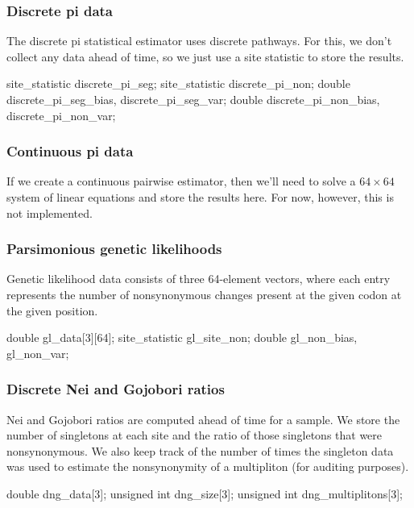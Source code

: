 \documentclass{article}
\begin{document}
      \subsubsection{Discrete pi data}

	The discrete pi statistical estimator uses discrete pathways. For this,
        we don't collect any data ahead of time, so we just use a site statistic
	to store the results.

\begin{ccode}
  site_statistic	discrete_pi_seg;
  site_statistic	discrete_pi_non;
  double		discrete_pi_seg_bias, discrete_pi_seg_var;
  double		discrete_pi_non_bias, discrete_pi_non_var;
\end{ccode}

      \subsubsection{Continuous pi data}

	If we create a continuous pairwise estimator, then we'll need to solve a
	$64 \times 64$ system of linear equations and store the results here.
	For now, however, this is not implemented.

      \subsubsection{Parsimonious genetic likelihoods}

	Genetic likelihood data consists of three 64-element vectors, where each
	entry represents the number of nonsynonymous changes present at the
	given codon at the given position.

\begin{ccode}
  double		gl_data[3][64];
  site_statistic	gl_site_non;
  double		gl_non_bias, gl_non_var;
\end{ccode}

      \subsubsection{Discrete Nei and Gojobori ratios}

	Nei and Gojobori ratios are computed ahead of time for a sample. We
	store the number of singletons at each site and the ratio of those
	singletons that were nonsynonymous. We also keep track of the number of
	times the singleton data was used to estimate the nonsynonymity of a
	multipliton (for auditing purposes).

\begin{ccode}
  double		dng_data[3];
  unsigned int		dng_size[3];
  unsigned int		dng_multiplitons[3];
\end{ccode}
\end{document}
